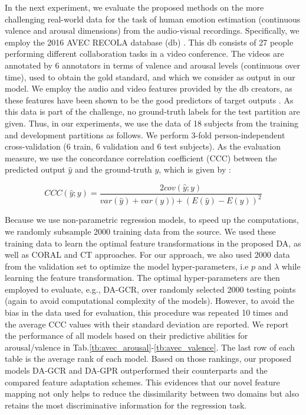 \documentclass{article}
\begin{document}
In the next experiment, we evaluate the proposed methods on the more challenging real-world data for the task of human emotion estimation (continuous valence and arousal dimensions) from the  audio-visual recordings. Specifically, we employ the 2016 AVEC RECOLA database (db) \cite{DBLP:conf/mm/ValstarGSRLTSSC16}. This db consists of 27 people  performing different collaboration tasks in a video conference. The videos are annotated by 6 annotators in terms of valence and arousal levels (continuous over time), used to obtain the gold standard, and which we consider as output in our model. We employ the audio and video features provided by the db creators, as these features have been shown to be the good predictors of target outputs \cite{DBLP:conf/mm/ValstarGSRLTSSC16}. As this data is part of the challenge, no ground-truth labels for the test partition are given. Thus, in our experiments, we use the data of 18 subjects from the training and development partitions as follows. We perform 3-fold person-independent cross-validation (6 train, 6 validation and 6 test subjects). As the evaluation measure, we use the concordance correlation coefficient (CCC) between the predicted output $\hat{y}$ and the ground-truth $y$, which is given by \cite{DBLP:conf/mm/ValstarGSRLTSSC16}: 
	
	
	\begin{equation}CCC(\hat{y}; y) = \frac{2 cov(\hat{y} ; y) }{ var(\hat{y}) +var(y)) + (E(\hat{y})-E(y))^2}\end{equation}
	

Because we use non-parametric regression models, to speed up the computations, we randomly subsample 2000 training data from the source. We used these training data to learn the optimal feature transformations in the proposed DA, as well as CORAL and CT approaches. For our approach, we also used 2000 data from the validation set to optimize the model hyper-parameters, i.e $p$ and $\lambda$ while learning the feature transformation. The optimal hyper-parameters are then employed to evaluate, e.g., DA-GCR, over randomly selected 2000 testing points (again to avoid computational complexity of the models). However, to avoid the bias in the data used for evaluation, this procedure was repeated 10 times and the average CCC values with their standard deviation are reported. We report the performance of all models based on their predictive abilities for arousal/valence in Tab.\ref{tb:avec_arousal}-\ref{tb:avec_valence}. The last row of each table is the average rank of each model. Based on those rankings, our proposed models DA-GCR and DA-GPR outperformed their counterparts and the compared feature adaptation schemes. This evidences that our novel feature mapping not only helps to reduce the dissimilarity between two domains but also retains the most discriminative information for the regression task. 
    
\end{document}
